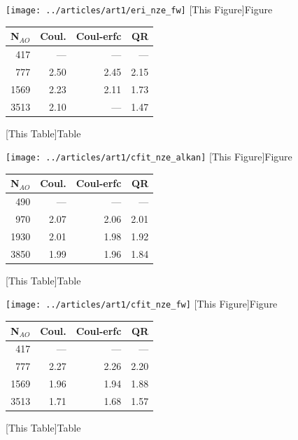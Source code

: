 \begin{figure}
\begin{minipage}{0.5\textwidth}
\texttt{[image: ../articles/art1/eri\_nze\_fw]}
[This Figure]{Figure}
\end{minipage}
\hspace{0.05\textwidth}
\begin{minipage}{0.3\textwidth}
\begin{tabular}{rrrr}
\hline
N$_{AO}$ & Coul. & Coul-erfc & QR \\ \hline
417 & --- & --- & --- \\ 
777 & 2.50 & 2.45 & 2.15 \\ 
1569 & 2.23 & 2.11 & 1.73 \\ 
3513 & 2.10 & --- & 1.47 \\ \hline
\end{tabular}
[This Table]{Table}
\end{minipage}
\end{figure}
%
\begin{figure}
\begin{minipage}{0.5\textwidth}
\texttt{[image: ../articles/art1/cfit\_nze\_alkan]}
[This Figure]{Figure}
\end{minipage}
\hspace{0.05\textwidth}
\begin{minipage}{0.3\textwidth}
\begin{tabular}{rrrr}
\hline
N$_{AO}$ & Coul. & Coul-erfc & QR \\ \hline
490 & --- & --- & --- \\ 
970 & 2.07 & 2.06 & 2.01 \\ 
1930 & 2.01 & 1.98 & 1.92 \\ 
3850 & 1.99 & 1.96 & 1.84 \\ \hline
\end{tabular}
[This Table]{Table}
\end{minipage}
\end{figure}
%
\begin{figure}
\begin{minipage}{0.5\textwidth}
\texttt{[image: ../articles/art1/cfit\_nze\_fw]}
[This Figure]{Figure}
\end{minipage}
\hspace{0.05\textwidth}
\begin{minipage}{0.3\textwidth}
\begin{tabular}{rrrr}
\hline
N$_{AO}$ & Coul. & Coul-erfc & QR \\ \hline
417 & --- & --- & --- \\ 
777 & 2.27 & 2.26 & 2.20 \\ 
1569 & 1.96 & 1.94 & 1.88 \\ 
3513 & 1.71 & 1.68 & 1.57 \\ \hline
\end{tabular}
[This Table]{Table}
\end{minipage}
\end{figure}
